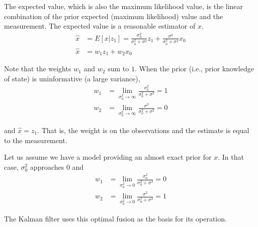 The expected value, which is also the maximum likelihood value, is the linear
combination of the prior expected (maximum likelihood) value and the
measurement. The expected value is a reasonable estimator of $x$.
\begin{align}
  \hat{x} &= E[x|z_1] = \frac{\sigma_0^2}{\sigma_0^2 + \sigma^2}z_1 +
    \frac{\sigma^2}{\sigma_0^2 + \sigma^2}x_0 \\
  \hat{x} &= w_1 z_1 + w_2 x_0 \nonumber
\end{align}

Note that the weights $w_1$ and $w_2$ sum to $1$. When the prior (i.e., prior
knowledge of \gls{state}) is uninformative (a large variance),
\begin{align}
  w_1 &= \lim_{\sigma_0^2 \to \infty} \frac{\sigma_0^2}{\sigma_0^2 + \sigma^2} = 1 \\
  w_2 &= \lim_{\sigma_0^2 \to \infty} \frac{\sigma^2}{\sigma_0^2 + \sigma^2} = 0
\end{align}

and $\hat{x} = z_1$. That is, the weight is on the observations and the estimate
is equal to the measurement.

Let us assume we have a \gls{model} providing an almost exact prior for $x$. In
that case, $\sigma_0^2$ approaches 0 and
\begin{align}
  w_1 &= \lim_{\sigma_0^2 \to 0} \frac{\sigma_0^2}{\sigma_0^2 + \sigma^2} = 0 \\
  w_2 &= \lim_{\sigma_0^2 \to 0} \frac{\sigma^2}{\sigma_0^2 + \sigma^2} = 1
\end{align}

The Kalman filter uses this optimal fusion as the basis for its operation.
